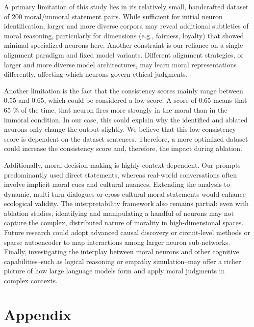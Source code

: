 \documentclass[runninghheads]{llncs}
\begin{document}
A primary limitation of this study lies in its relatively small, handcrafted dataset of 200 moral/immoral statement pairs. While sufficient for initial neuron identification, larger and more diverse corpora may reveal additional subtleties of moral reasoning, particularly for dimensions (e.g., fairness, loyalty) that showed minimal specialized neurons here. Another constraint is our reliance on a single alignment paradigm and fixed model variants. Different alignment strategies, or larger and more diverse model architectures, may learn moral representations differently, affecting which neurons govern ethical judgments.

Another limitation is the fact that the consistency scores mainly range between 0.55 and 0.65, which could be considered a low score. A score of 0.65 means that 65 \% of the time, that neuron fires more strongly in the moral than in the immoral condition. In our case, this could explain why the identified and ablated neurons only change the output slightly. We believe that this low consistency score is dependent on the dataset sentences. Therefore, a more optimized dataset could increase the consistency score and, therefore, the impact during ablation. 

Additionally, moral decision-making is highly context-dependent. Our prompts predominantly used direct statements, whereas real-world conversations often involve implicit moral cues and cultural nuances. Extending the analysis to dynamic, multi-turn dialogues or cross-cultural moral statements would enhance ecological validity. The interpretability framework also remains partial: even with ablation studies, identifying and manipulating a handful of neurons may not capture the complex, distributed nature of morality in high-dimensional spaces. Future research could adopt advanced causal discovery or circuit-level methods or sparse autoencoder to map interactions among larger neuron sub-networks. Finally, investigating the interplay between moral neurons and other cognitive capabilities--such as logical reasoning or empathy simulation--may offer a richer picture of how large language models form and apply moral judgments in complex contexts.











\section*{Appendix}
\label{appendix}
\end{document}
